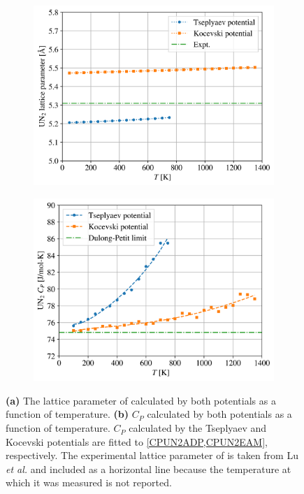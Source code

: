 \documentclass[preprint, 12pt]{elsarticle}
\begin{document}
\begin{figure}[h!]
\centering
\begin{subfigure}{0.45\textwidth}
    \includegraphics[width=\textwidth]{UN2a.png}
    \caption{}
    \label{Fig:UN2a}
\end{subfigure}
\hfill
\begin{subfigure}{0.45\textwidth}
    \includegraphics[width=\textwidth]{UN2CP.png}
    \caption{}
    \label{Fig:UN2CP}
\end{subfigure}
\caption{\textbf{(a)} The lattice parameter of  calculated by both potentials as a function of temperature. \textbf{(b)}  $C_P$ calculated by both potentials as a function of temperature. $C_P$ calculated by the Tseplyaev and Kocevski potentials are fitted to \cref{CPUN2ADP,CPUN2EAM}, respectively. The experimental lattice parameter of  is taken from Lu \textit{et al.} \cite{Lu2011} and included as a horizontal line because the temperature at which it was measured is not reported.}
\label{Fig:UN2}
\end{figure}
\end{document}
